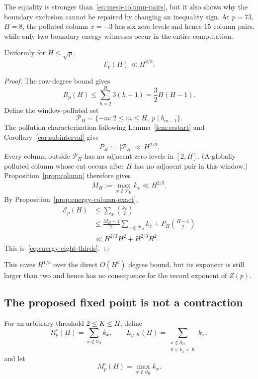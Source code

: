 The equality is stronger than~\eqref{eq:meso-column-pairs}, but it also
shows why the boundary exclusion cannot be repaired by changing an
inequality sign.  At $p=73$, $H=8$, the polluted column $x=-3$ has six
zero levels and hence $15$ column pairs, while only two boundary energy
witnesses occur in the entire computation.

\begin{corollary}
\label{cor:energy-eight-thirds}
Uniformly for $H\leq\sqrt p$,
\begin{equation}\label{eq:energy-eight-thirds}
 \mathcal E_p(H)\ll H^{8/3}.
\end{equation}
\end{corollary}

\begin{proof}
The row-degree bound gives
\begin{equation}\label{eq:energy-R-trivial}
 R_p(H)\leq\sum_{h=2}^H3(h-1)=\frac32H(H-1).
\end{equation}
Define the window-polluted set
\[
 \mathcal P_H=
 \{-m:2\leq m\leq H,\ p\mid b_{m-1}\}.
\]
The pollution characterization following Lemma~\ref{lem:restart} and
Corollary~\ref{cor:subinterval} give
\[
 P_H:=|\mathcal P_H|\ll H^{2/3}.
\]
Every column outside $\mathcal P_H$ has no adjacent zero levels in
$[2,H]$.  (A globally polluted column whose cut occurs after $H$ has no
adjacent pair in this window.)  Proposition~\ref{prop:column} therefore
gives
\[
 M_H:=\max_{x\notin\mathcal P_H}k_x\ll H^{2/3}.
\]
By Proposition~\ref{prop:energy-column-exact},
\begin{align*}
 \mathcal E_p(H)
 &\leq\sum_x\binom{k_x}{2}\\
 &\leq\frac{M_H-1}{2}
       \sum_{x\notin\mathcal P_H}k_x
       +P_H\binom{H-1}{2}\\
 &\ll H^{2/3}H^2+H^{2/3}H^2.
\end{align*}
This is~\eqref{eq:energy-eight-thirds}.
\end{proof}

This saves $H^{1/3}$ over the direct $O(H^3)$ degree bound, but its
exponent is still larger than two and hence has no consequence for the
record exponent of $Z(p)$.

\subsection{The proposed fixed point is not a contraction}

For an arbitrary threshold $2\leq K\leq H$, define
\[
 R_p^\circ(H)=\sum_{x\notin\partial_H}k_x,
 \qquad
 L_{p,K}(H)=
 \sum_{\substack{x\notin\partial_H\\0<k_x<K}}k_x,
\]
and let
\[
 M_p^\circ(H)=\max_{x\notin\partial_H}k_x.
\]

